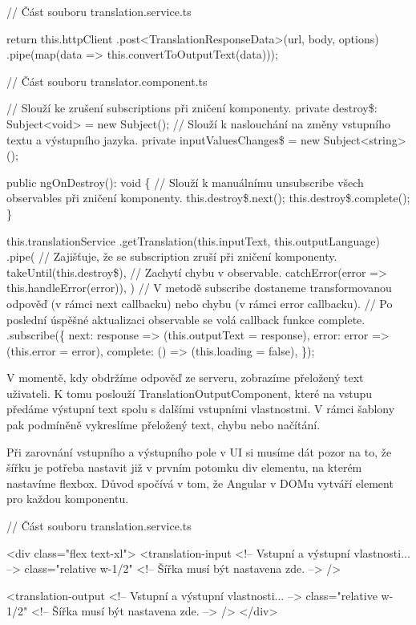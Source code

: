 \begin{prog}
// Část souboru translation.service.ts

return this.httpClient
  .post<TranslationResponseData>(url, body, options)
  .pipe(map(data => this.convertToOutputText(data)));

// Část souboru translator.component.ts

// Slouží ke zrušení subscriptions při zničení komponenty.
private destroy\$: Subject<void> = new Subject();
// Slouží k naslouchání na změny vstupního textu a výstupního jazyka.
private inputValuesChanges\$ = new Subject<string>();

public ngOnDestroy(): void \{
  // Slouží k manuálnímu unsubscribe všech observables při zničení komponenty.
  this.destroy\$.next();
  this.destroy\$.complete();
\}

this.translationService
  .getTranslation(this.inputText, this.outputLanguage)
  .pipe(
    // Zajišťuje, že se subscription zruší při zničení komponenty.
    takeUntil(this.destroy\$),
    // Zachytí chybu v observable.
    catchError(error => this.handleError(error)),
  )
  // V metodě subscribe dostaneme transformovanou odpověď 
    (v rámci next callbacku) nebo chybu (v rámci error callbacku).
  // Po poslední úspěšné aktualizaci observable se volá callback funkce complete.
  .subscribe(\{
    next: response => (this.outputText = response),
    error: error => (this.error = error),
    complete: () => (this.loading = false),
  \});
\end{prog}

V momentě, kdy obdržíme odpověď ze serveru, zobrazíme přeložený text uživateli. 
K tomu poslouží TranslationOutputComponent, které na vstupu předáme výstupní text spolu s dalšími vstupními vlastnostmi. 
V rámci šablony pak podmíněně vykreslíme přeložený text, chybu nebo načítání. 

Při zarovnání vstupního a výstupního pole v UI si musíme dát pozor na to, že šířku je potřeba nastavit již v prvním potomku div elementu, na kterém nastavíme flexbox. 
Důvod spočívá v tom, že Angular v DOMu vytváří element pro každou komponentu.

\begin{prog}
// Část souboru translation.service.ts

<div class="flex text-xl">
  <translation-input 
    <!-- Vstupní a výstupní vlastnosti... -->
    class="relative w-1/2"
    <!-- Šířka musí být nastavena zde. -->
  />

  <translation-output 
    <!-- Vstupní a výstupní vlastnosti... -->
    class="relative w-1/2"
    <!-- Šířka musí být nastavena zde. -->
  />
</div>
\end{prog}

